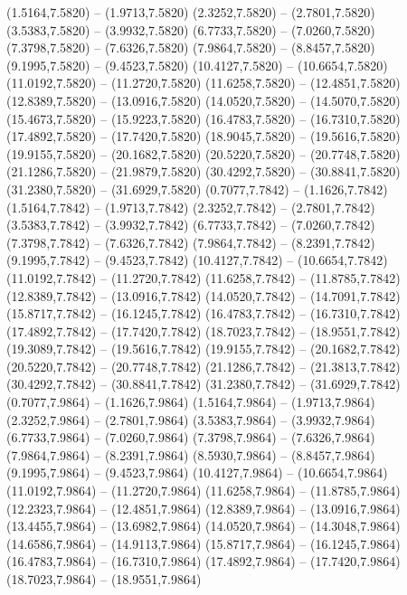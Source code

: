 {\begin{scope}[shift={(#1,#2)}]
    (1.5164,7.5820) -- (1.9713,7.5820)
    (2.3252,7.5820) -- (2.7801,7.5820)
    (3.5383,7.5820) -- (3.9932,7.5820)
    (6.7733,7.5820) -- (7.0260,7.5820)
    (7.3798,7.5820) -- (7.6326,7.5820)
    (7.9864,7.5820) -- (8.8457,7.5820)
    (9.1995,7.5820) -- (9.4523,7.5820)
    (10.4127,7.5820) -- (10.6654,7.5820)
    (11.0192,7.5820) -- (11.2720,7.5820)
    (11.6258,7.5820) -- (12.4851,7.5820)
    (12.8389,7.5820) -- (13.0916,7.5820)
    (14.0520,7.5820) -- (14.5070,7.5820)
    (15.4673,7.5820) -- (15.9223,7.5820)
    (16.4783,7.5820) -- (16.7310,7.5820)
    (17.4892,7.5820) -- (17.7420,7.5820)
    (18.9045,7.5820) -- (19.5616,7.5820)
    (19.9155,7.5820) -- (20.1682,7.5820)
    (20.5220,7.5820) -- (20.7748,7.5820)
    (21.1286,7.5820) -- (21.9879,7.5820)
    (30.4292,7.5820) -- (30.8841,7.5820)
    (31.2380,7.5820) -- (31.6929,7.5820)
    (0.7077,7.7842) -- (1.1626,7.7842)
    (1.5164,7.7842) -- (1.9713,7.7842)
    (2.3252,7.7842) -- (2.7801,7.7842)
    (3.5383,7.7842) -- (3.9932,7.7842)
    (6.7733,7.7842) -- (7.0260,7.7842)
    (7.3798,7.7842) -- (7.6326,7.7842)
    (7.9864,7.7842) -- (8.2391,7.7842)
    (9.1995,7.7842) -- (9.4523,7.7842)
    (10.4127,7.7842) -- (10.6654,7.7842)
    (11.0192,7.7842) -- (11.2720,7.7842)
    (11.6258,7.7842) -- (11.8785,7.7842)
    (12.8389,7.7842) -- (13.0916,7.7842)
    (14.0520,7.7842) -- (14.7091,7.7842)
    (15.8717,7.7842) -- (16.1245,7.7842)
    (16.4783,7.7842) -- (16.7310,7.7842)
    (17.4892,7.7842) -- (17.7420,7.7842)
    (18.7023,7.7842) -- (18.9551,7.7842)
    (19.3089,7.7842) -- (19.5616,7.7842)
    (19.9155,7.7842) -- (20.1682,7.7842)
    (20.5220,7.7842) -- (20.7748,7.7842)
    (21.1286,7.7842) -- (21.3813,7.7842)
    (30.4292,7.7842) -- (30.8841,7.7842)
    (31.2380,7.7842) -- (31.6929,7.7842)
    (0.7077,7.9864) -- (1.1626,7.9864)
    (1.5164,7.9864) -- (1.9713,7.9864)
    (2.3252,7.9864) -- (2.7801,7.9864)
    (3.5383,7.9864) -- (3.9932,7.9864)
    (6.7733,7.9864) -- (7.0260,7.9864)
    (7.3798,7.9864) -- (7.6326,7.9864)
    (7.9864,7.9864) -- (8.2391,7.9864)
    (8.5930,7.9864) -- (8.8457,7.9864)
    (9.1995,7.9864) -- (9.4523,7.9864)
    (10.4127,7.9864) -- (10.6654,7.9864)
    (11.0192,7.9864) -- (11.2720,7.9864)
    (11.6258,7.9864) -- (11.8785,7.9864)
    (12.2323,7.9864) -- (12.4851,7.9864)
    (12.8389,7.9864) -- (13.0916,7.9864)
    (13.4455,7.9864) -- (13.6982,7.9864)
    (14.0520,7.9864) -- (14.3048,7.9864)
    (14.6586,7.9864) -- (14.9113,7.9864)
    (15.8717,7.9864) -- (16.1245,7.9864)
    (16.4783,7.9864) -- (16.7310,7.9864)
    (17.4892,7.9864) -- (17.7420,7.9864)
    (18.7023,7.9864) -- (18.9551,7.9864)

\end{scope}}
